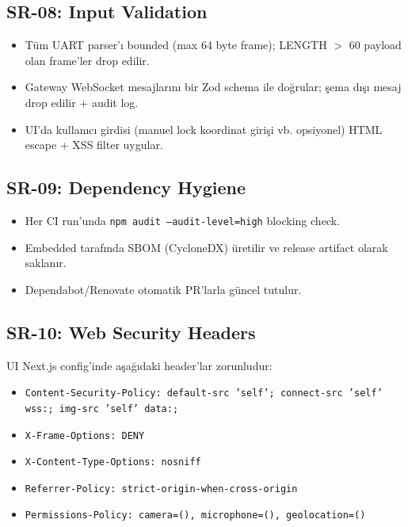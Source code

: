 \subsection{SR-08: Input Validation}
\begin{itemize}
    \item Tüm UART parser'ı bounded (max 64 byte frame); LENGTH $>$ 60 payload olan frame'ler drop edilir.
    \item Gateway WebSocket mesajlarını bir Zod schema ile doğrular; şema dışı mesaj drop edilir + audit log.
    \item UI'da kullanıcı girdisi (manuel lock koordinat girişi vb. opsiyonel) HTML escape + XSS filter uygular.
\end{itemize}

\subsection{SR-09: Dependency Hygiene}
\begin{itemize}
    \item Her CI run'unda \texttt{npm audit --audit-level=high} blocking check.
    \item Embedded tarafında SBOM (CycloneDX) üretilir ve release artifact olarak saklanır.
    \item Dependabot/Renovate otomatik PR'larla güncel tutulur.
\end{itemize}

\subsection{SR-10: Web Security Headers}
UI Next.js config'inde aşağıdaki header'lar zorunludur:
\begin{itemize}
    \item \texttt{Content-Security-Policy: default-src 'self'; connect-src 'self' wss:; img-src 'self' data:;}
    \item \texttt{X-Frame-Options: DENY}
    \item \texttt{X-Content-Type-Options: nosniff}
    \item \texttt{Referrer-Policy: strict-origin-when-cross-origin}
    \item \texttt{Permissions-Policy: camera=(), microphone=(), geolocation=()}
\end{itemize}
